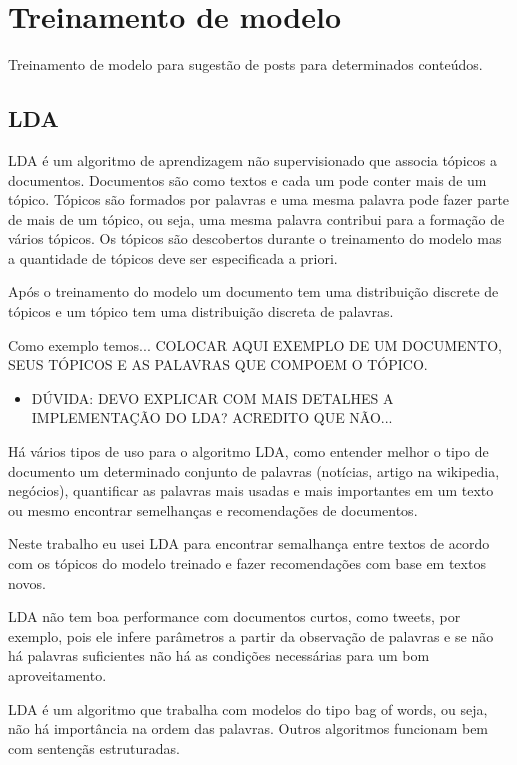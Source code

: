 \section{Treinamento de modelo}

Treinamento de modelo para sugestão de posts para determinados conteúdos.

\subsection{LDA}

LDA é um algoritmo de aprendizagem não supervisionado que associa tópicos a documentos. Documentos são como textos e cada um pode conter mais de um tópico.
Tópicos são formados por palavras e uma mesma palavra pode fazer parte de mais de um tópico, ou seja, uma mesma palavra contribui para a formação de vários 
tópicos. Os tópicos são descobertos durante o treinamento do modelo mas a quantidade de tópicos deve ser especificada a priori.

Após o treinamento do modelo um documento tem uma distribuição discrete de tópicos e um tópico tem uma distribuição discreta de palavras. 

Como exemplo temos... COLOCAR AQUI EXEMPLO DE UM DOCUMENTO, SEUS TÓPICOS E AS PALAVRAS QUE COMPOEM O TÓPICO.

\begin{itemize}
    \item DÚVIDA: DEVO EXPLICAR COM MAIS DETALHES A IMPLEMENTAÇÃO DO LDA? ACREDITO QUE NÃO...
\end{itemize}

Há vários tipos de uso para o algoritmo LDA, como entender melhor o tipo de documento um determinado conjunto de palavras (notícias, artigo na wikipedia, 
negócios), quantificar as palavras mais usadas e mais importantes em um texto ou mesmo encontrar semelhanças e recomendações de documentos. 

Neste trabalho eu usei LDA para encontrar semalhança entre textos de acordo com os tópicos do modelo treinado e fazer recomendações com base em textos novos.

LDA não tem boa performance com documentos curtos, como tweets, por exemplo, pois ele infere parâmetros a partir da observação de palavras e se não há palavras
suficientes não há as condições necessárias para um bom aproveitamento.

LDA é um algoritmo que trabalha com modelos do tipo bag of words, ou seja, não há importância na ordem das palavras. Outros algoritmos funcionam bem com sentençãs
estruturadas.

